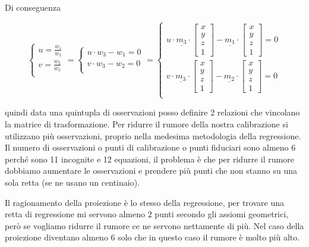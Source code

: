Di conseguenza

$$\begin{cases}
    u = \frac{w_1}{w_3}\\
    v = \frac{w_2}{w_3}\\
\end{cases} = \begin{cases}
    u \cdot w_3 - w_1 = 0\\
    v \cdot w_3 - w_2 = 0\\
\end{cases} = \begin{cases}
    u \cdot \underline{m_3} \cdot \left[\begin{array}{c}
        x\\y\\z\\1
    \end{array}\right] - \underline{m_1} \cdot \left[\begin{array}{c}
        x\\y\\z\\1
    \end{array}\right] = 0\\
    v \cdot \underline{m_3} \cdot \left[\begin{array}{c}
        x\\y\\z\\1
    \end{array}\right] - \underline{m_2} \cdot \left[\begin{array}{c}
        x\\y\\z\\1
    \end{array}\right] = 0\\
\end{cases}   $$

quindi data una quintupla di osservazioni posso definire 2 relazioni che vincolano 
la matrice di trasformazione. Per ridurre il rumore della nostra calibrazione si 
utilizzano più osservazioni, proprio nella medesima metodologia della regressione.
Il numero di osservazioni o punti di calibrazione o punti fiduciari sono almeno $6$ perché sono 
11 incognite e 12 equazioni, il problema è che per ridurre il rumore dobbiamo 
aumentare le osservazioni e prendere più punti che non stanno su una sola retta (se ne 
usano un centinaio).

\begin{nota}
    Il ragionamento della proiezione è lo stesso della regressione, per trovare 
    una retta di regressione mi servono almeno $2$ punti secondo gli assiomi geometrici,
    però se vogliamo ridurre il rumore ce ne servono nettamente di più. Nel caso 
    della proiezione diventano almeno $6$ solo che in questo caso il rumore è molto 
    più alto.
\end{nota}

